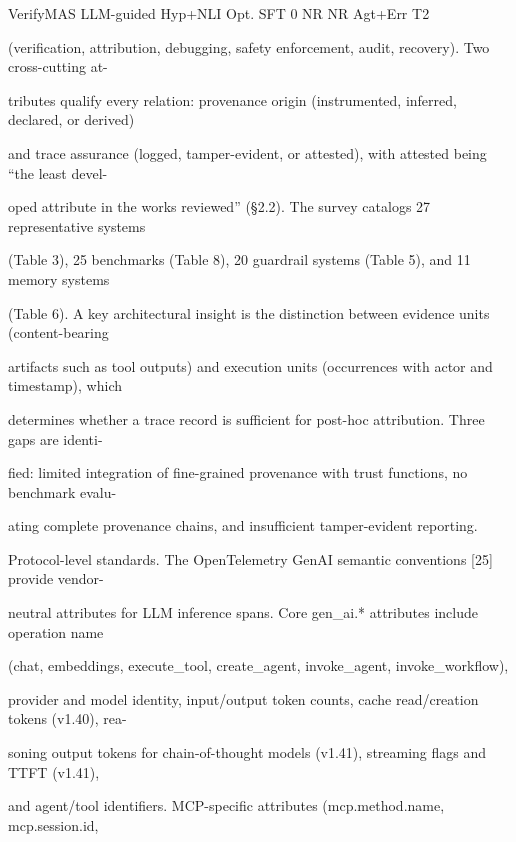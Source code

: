\begin{flushleft}
\noindent VerifyMAS LLM-guided Hyp+NLI Opt. SFT 0 NR NR Agt+Err T2\par
\par\smallskip
\par\smallskip
\noindent (verification, attribution, debugging, safety enforcement, audit, recovery). Two cross-cutting at-\par
\noindent tributes qualify every relation: provenance origin (instrumented, inferred, declared, or derived)\par
\noindent and trace assurance (logged, tamper-evident, or attested), with attested being “the least devel-\par
\noindent oped attribute in the works reviewed” (§2.2). The survey catalogs 27 representative systems\par
\noindent (Table 3), 25 benchmarks (Table 8), 20 guardrail systems (Table 5), and 11 memory systems\par
\noindent (Table 6). A key architectural insight is the distinction between evidence units (content-bearing\par
\noindent artifacts such as tool outputs) and execution units (occurrences with actor and timestamp), which\par
\noindent determines whether a trace record is sufficient for post-hoc attribution. Three gaps are identi-\par
\noindent fied: limited integration of fine-grained provenance with trust functions, no benchmark evalu-\par
\noindent ating complete provenance chains, and insufficient tamper-evident reporting.\par
\par\smallskip
\noindent Protocol-level standards. The OpenTelemetry GenAI semantic conventions [25] provide vendor-\par
\noindent neutral attributes for LLM inference spans. Core gen\_ai.* attributes include operation name\par
\noindent (chat, embeddings, execute\_tool, create\_agent, invoke\_agent, invoke\_workflow),\par
\noindent provider and model identity, input/output token counts, cache read/creation tokens (v1.40), rea-\par
\noindent soning output tokens for chain-of-thought models (v1.41), streaming flags and TTFT (v1.41),\par
\noindent and agent/tool identifiers. MCP-specific attributes (mcp.method.name, mcp.session.id,\par

\end{flushleft}
